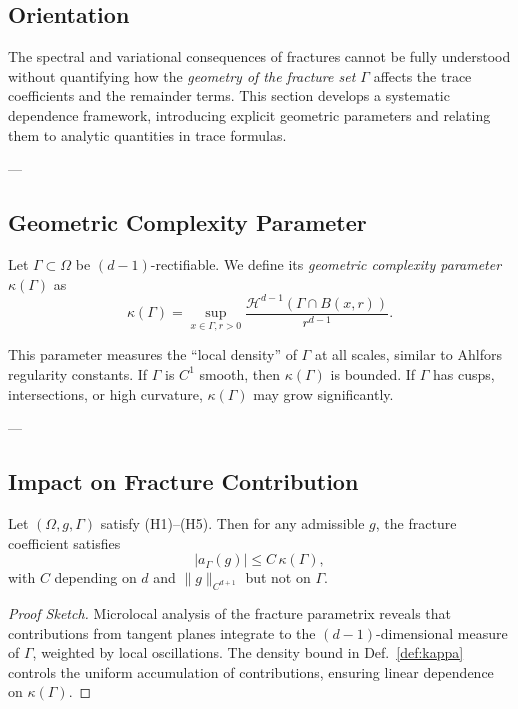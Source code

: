 \subsection*{Orientation}
The spectral and variational consequences of fractures 
cannot be fully understood without quantifying 
how the \emph{geometry of the fracture set $\Gamma$} 
affects the trace coefficients and the remainder terms.  
This section develops a systematic dependence framework, 
introducing explicit geometric parameters 
and relating them to analytic quantities in trace formulas.  

---

\subsection{Geometric Complexity Parameter}

\begin{definition}
\label{def:kappa}
Let $\Gamma \subset \Omega$ be $(d-1)$-rectifiable.  
We define its \emph{geometric complexity parameter} $\kappa(\Gamma)$ as
\[
\kappa(\Gamma) 
= \sup_{x \in \Gamma, r>0} 
\frac{\mathcal{H}^{d-1}(\Gamma \cap B(x,r))}{r^{d-1}}.
\]
\end{definition}

\begin{remark}
This parameter measures the “local density” of $\Gamma$ 
at all scales, similar to Ahlfors regularity constants.  
If $\Gamma$ is $C^1$ smooth, then $\kappa(\Gamma)$ is bounded.  
If $\Gamma$ has cusps, intersections, or high curvature, 
$\kappa(\Gamma)$ may grow significantly.  
\end{remark}

---

\subsection{Impact on Fracture Contribution}

\begin{theorem}
\label{thm:fracture-coefficient-geometry}
Let $(\Omega,g,\Gamma)$ satisfy (H1)--(H5).  
Then for any admissible $g$, 
the fracture coefficient satisfies
\[
|a_\Gamma(g)| \leq C \, \kappa(\Gamma),
\]
with $C$ depending on $d$ and $\|g\|_{C^{d+1}}$ but not on $\Gamma$.  
\end{theorem}

\begin{proof}[Proof Sketch]
Microlocal analysis of the fracture parametrix 
reveals that contributions from tangent planes 
integrate to the $(d-1)$-dimensional measure of $\Gamma$, 
weighted by local oscillations.  
The density bound in Def.~\ref{def:kappa} 
controls the uniform accumulation of contributions, 
ensuring linear dependence on $\kappa(\Gamma)$.  
\end{proof}

